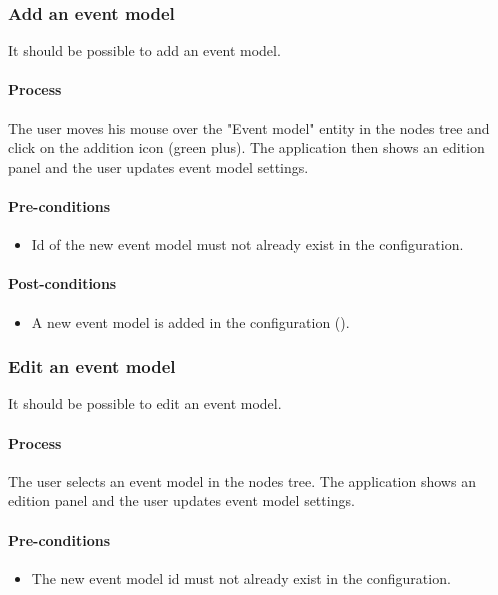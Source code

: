\documentclass[11pt,a4paper,oneside]{article}
\begin{document}
\subsubsection{Add an event model}
It should be possible to add an event model.

\paragraph{Process}
The user moves his mouse over the "Event model" entity in the nodes tree and click on the addition icon (green plus). The application then shows an edition panel and the user updates event model settings.

\paragraph{Pre-conditions}
\begin{itemize}
	\item Id of the new event model must not already exist in the configuration.
\end{itemize}

\paragraph{Post-conditions}
\begin{itemize}
	\item A new event model is added in the configuration ().
\end{itemize}

\subsubsection{Edit an event model}
It should be possible to edit an event model.

\paragraph{Process}
The user selects an event model in the nodes tree. The application shows an edition panel and the user updates event model settings.

\paragraph{Pre-conditions}
\begin{itemize}
	\item The new event model id must not already exist in the configuration.
\end{itemize}
\end{document}
